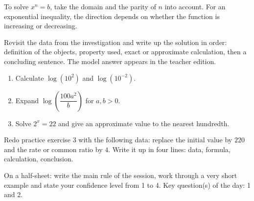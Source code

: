 \begin{traceecrite}To solve $x^n=b$, take the domain and the parity of $n$ into account. For an exponential inequality, the direction depends on whether the function is increasing or decreasing.\end{traceecrite}

\begin{exemple}
Revisit the data from the investigation and write up the solution in order: definition of the objects, property used, exact or approximate calculation, then a concluding sentence. The model answer appears in the teacher edition.
\end{exemple}

\begin{exercice}[-- essential]
\begin{enumerate}\item Calculate $\log(10^2)$ and $\log(10^{-2})$.\item Expand $\log\!\left(\dfrac{100a^2}{b}\right)$ for $a,b>0$.\item Solve $2^x=22$ and give an approximate value to the nearest hundredth.\end{enumerate}
\end{exercice}


\begin{dm}Redo practice exercise 3 with the following data: replace the initial value by $220$ and the rate or common ratio by $4$. Write it up in four lines: data, formula, calculation, conclusion.\end{dm}

\begin{sortie}On a half-sheet: write the main rule of the session, work through a very short example and state your confidence level from 1 to 4. Key question(s) of the day: 1 and 2.\end{sortie}

